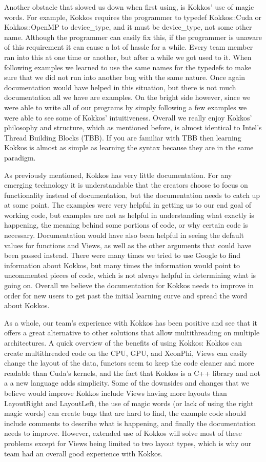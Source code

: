 Another obstacle that slowed us down when first using, is Kokkos' use of magic
words. For example, Kokkos requires the programmer to typedef Kokkos::Cuda or
Kokkos::OpenMP to device\_type, and it must be device\_type, not some other
name. Although the programmer can easily fix this, if the programmer is unaware
of this requirement it can cause a lot of hassle for a while. Every team member
ran into this at one time or another, but after a while we got used to it. When
following examples we learned to use the same names for the typedefs to make
sure that we did not run into another bug with the same nature. Once again
documentation would have helped in this situation, but there is not much
documentation all we have are examples. On the bright side however, since we
were able to write all of our programs by simply following a few examples we
were able to see some of Kokkos' intuitiveness. Overall we really enjoy Kokkos'
philosophy and structure, which as mentioned before, is almost identical to
Intel's Thread Building Blocks (TBB). If you are familiar with TBB then
learning Kokkos is almost as simple as learning the syntax because they are in
the same paradigm. 

As previously mentioned, Kokkos has very little documentation. For any emerging
technology it is understandable that the creators choose to focus on
functionality instead of documentation, but the documentation needs to catch up
at some point. The examples were very helpful in getting us to our end goal of
working code, but examples are not as helpful in understanding what exactly is
happening, the meaning behind some portions of code, or why certain code is
necessary. Documentation would have also been helpful in seeing the default
values for functions and Views, as well as the other arguments that could have
been passed instead. There were many times we tried to use Google to find
information about Kokkos, but many times the information would point to
uncommented pieces of code, which is not always helpful in determining what is
going on. Overall we believe the documentation for Kokkos needs to improve in
order for new users to get past the initial learning curve and spread the word
about Kokkos. 

As a whole, our team's experience with Kokkos has been positive and see that it
offers a great alternative to other solutions that allow multithreading on
multiple architectures. A quick overview of the benefits of using Kokkos:
Kokkos can create multithreaded code on the CPU, GPU, and XeonPhi, Views can
easily change the layout of the data, functors seem to keep the code cleaner
and more readable than Cuda's kernels, and the fact that Kokkos is a C++
library and not a a new language adds simplicity. Some of the downsides and
changes that we believe would improve Kokkos include Views having more layouts
than LayoutRight and LayoutLeft, the use of magic words (or lack of using the
right magic words) can create bugs that are hard to find, the example code
should include comments to describe what is happening, and finally the
documentation needs to improve. However, extended use of Kokkos will solve most
of these problems except for Views being limited to two layout types, which is
why our team had an overall good experience with Kokkos.


